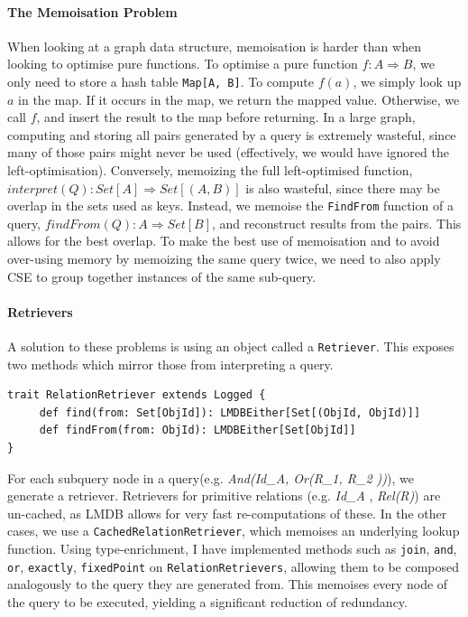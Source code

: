\documentclass[12pt,a4paper,twoside,openright]{report}
\newcommand\codeName[1]{\texttt{#1}}
\newcommand\mathName[1]{\textit{#1}}
\renewcommand{\baselinestretch}{1.1}    %
\let\oldparagraph\paragraph
\renewcommand{\paragraph}[1]{\oldparagraph{#1}\mbox{}}
\begin{document}
		\paragraph{The Memoisation Problem}
		When looking at a graph data structure, memoisation is harder than when looking to optimise pure functions. To optimise a pure function $f\colon A \Rightarrow B$, we only need to store a hash table \codeName{Map[A, B]}. To compute $f(a)$, we simply look up $a$ in the map. If it occurs in the map, we return the mapped value. Otherwise, we call $f$, and insert the result to the map before returning. In a large graph, computing and storing all pairs generated by a query is extremely wasteful, since many of those pairs might never be used (effectively, we would have ignored the left-optimisation). Conversely, memoizing the full left-optimised function, $interpret(Q)\colon Set[A] \Rightarrow Set[(A, B)]$ is also wasteful, since there may be overlap in the sets used as keys. Instead, we memoise the \codeName{FindFrom} function of a query, $findFrom(Q)\colon A \Rightarrow Set[B]$, and reconstruct results from the pairs. This allows for the best overlap. To make the best use of memoisation and to avoid over-using memory by memoizing the same query twice, we need to also apply CSE to group together instances of the same sub-query.

		\paragraph{Retrievers}
		A solution to these problems is using an object called a \codeName{Retriever}. This exposes two methods which mirror those from interpreting a query. 
		\renewcommand{\baselinestretch}{0.8}
		\begin{framed}
			\begin{verbatim}
trait RelationRetriever extends Logged {
     def find(from: Set[ObjId]): LMDBEither[Set[(ObjId, ObjId)]]
     def findFrom(from: ObjId): LMDBEither[Set[ObjId]]
}
			\end{verbatim}
		\end{framed}
		\renewcommand{\baselinestretch}{1.1}
		
		For each subquery node in a query(e.g. \mathName{And(Id_A, Or(R_1, R_2 ))}), we generate a retriever. Retrievers for primitive relations (e.g. \mathName{Id_A} , \mathName{Rel(R)}) are un-cached, as LMDB allows for very fast re-computations of these. In the other cases, we use a \codeName{CachedRelationRetriever}, which memoises an underlying lookup function. Using type-enrichment, I have implemented methods such as \codeName{join}, \codeName{and}, \codeName{or}, \codeName{exactly}, \codeName{fixedPoint} on \codeName{RelationRetrievers}, allowing them to be composed analogously to the query they are generated from. This memoises every node of the query to be executed, yielding a significant reduction of redundancy.
	
\end{document}
